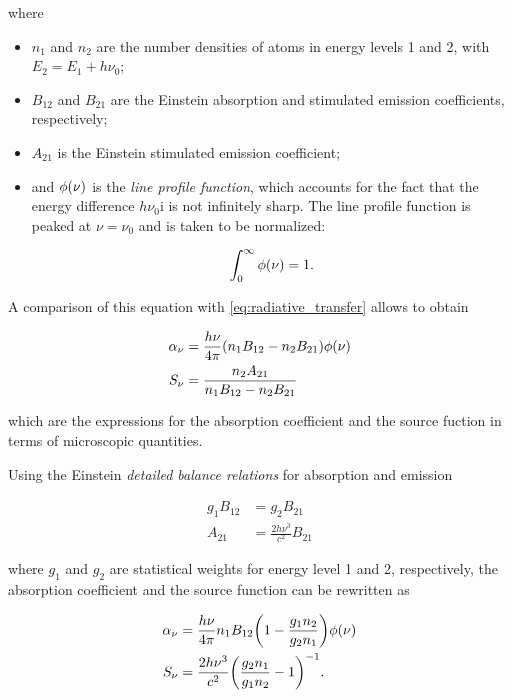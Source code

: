 where

\begin{itemize}
        \item $n_1$ and $n_2$ are the number densities of atoms in energy
        levels 1 and 2, with $E_2 = E_1 + h\nu_0$;
        \item $B_{12}$ and $B_{21}$ are the Einstein absorption and
        stimulated emission coefficients, respectively;
        \item $A_{21}$ is the Einstein stimulated emission coefficient;
        \item and $\phi\qty(\nu)$ is the \emph{line profile function},
        which accounts for the fact that the energy difference $h\nu_0$i
        is not infinitely sharp. The line profile function is peaked at
        $\nu = \nu_0$ and is taken to be normalized:

        \begin{equation}
                \int^\infty_0 \phi\qty(\nu) = 1.
        \end{equation}

\end{itemize}

A comparison of this equation with \autoref{eq:radiative_transfer} allows
to obtain

\begin{align}
        \alpha_\nu & = \frac{h\nu}{4\pi}\qty(n_1 B_{12} -
        n_2 B_{21})\phi\qty(\nu) \\
        S_\nu & = \frac{n_2 A_{21}}{n_1 B_{12} - n_2 B_{21}}
\end{align}

which are the expressions for the absorption coefficient and the source
fuction in terms of microscopic quantities.

Using the Einstein \emph{detailed balance relations} for absorption and
emission

\begin{align}
        g_1 B_{12} & = g_2 B_{21} \\
        A_{21} & = \frac{2h\nu^3}{c^2} B_{21}
\end{align}

where $g_1$ and $g_2$ are statistical weights for energy level 1 and 2,
respectively, the absorption coefficient and the source function can be
rewritten as

\begin{align}
        \alpha_\nu & = \frac{h\nu}{4\pi} n_1 B_{12}
        \qty(1 - \frac{g_1 n_2}{g_2 n_1})\phi\qty(\nu)\\
        S_\nu & = \frac{2h\nu^3}{c^2}\qty(\frac{g_2 n_1}{g_1 n_2} - 1)^{-1}.
        \label{eq:gen_kirchhoff_law}
\end{align}

